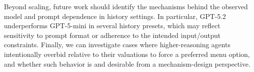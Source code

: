 \documentclass[a4paper]{article}
\begin{document}
Beyond scaling, future work should identify the mechanisms behind the observed model and prompt dependence in history settings. In particular, GPT-5.2 underperforms GPT-5-mini in several history presets, which may reflect sensitivity to prompt format or adherence to the intended input/output constraints. Finally, we can investigate cases where higher-reasoning agents intentionally overbid relative to their valuations to force a preferred menu option, and whether such behavior is and desirable from a mechanism-design perspective.



\newpage
\printbibliography[title={references}]
\end{document}
